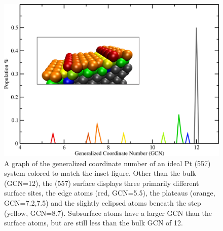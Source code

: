 
\chapter{}
\label{app:SI2}

\begin{figure}
\includegraphics[width=\linewidth]{../figures/appB/557_ideal_gcn.pdf}
\caption{A graph of the generalized coordinate number of an ideal Pt (557)
system colored to match the inset figure. Other than the bulk (GCN=12), the
(557) surface displays three primarily different surface sites, the edge atoms
(red, GCN=5.5), the plateaus (orange, GCN=7.2,7.5) and the slightly eclipsed
atoms beneath the step (yellow, GCN=8.7). Subsurface atoms have a larger GCN
than the surface atoms, but are still less than the bulk GCN of 12.}
\label{fig:557GCN}
\end{figure}


\newpage


